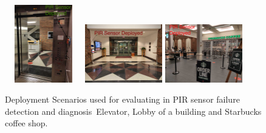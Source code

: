 \begin{figure}[t!]
	\centering
	\includegraphics[width=0.3\textwidth, height=1.33in]{figures/deployment/elevator/Elevator-jpg.jpg}
	\includegraphics[width=0.3\textwidth]{figures/deployment/lobby/lobby.jpg}
	\includegraphics[width=0.3\textwidth]{figures/deployment/coffee_shop/Starbucks-jpg.jpg}
	\caption{\footnotesize{Deployment Scenarios} used for evaluating \sol in PIR sensor failure detection and diagnosis~\viz Elevator, Lobby of a building and Starbucks coffee shop.}
	\label{fig:pir_deployment_scenario}
\end{figure}
